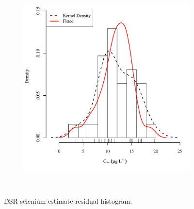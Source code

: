 \begin{linenumbers}
\begin{landscape}
\begin{figure}
\begin{subfigure}{0.7\textwidth}
			\includegraphics[width=\tableCustomSize]{"Figures/Results_DSR/Stochastic/Conc Model ResDist WIL"}
		\end{subfigure}\\
		\caption{DSR selenium estimate residual histogram.}
	\end{figure}
\end{landscape}


\end{linenumbers}
